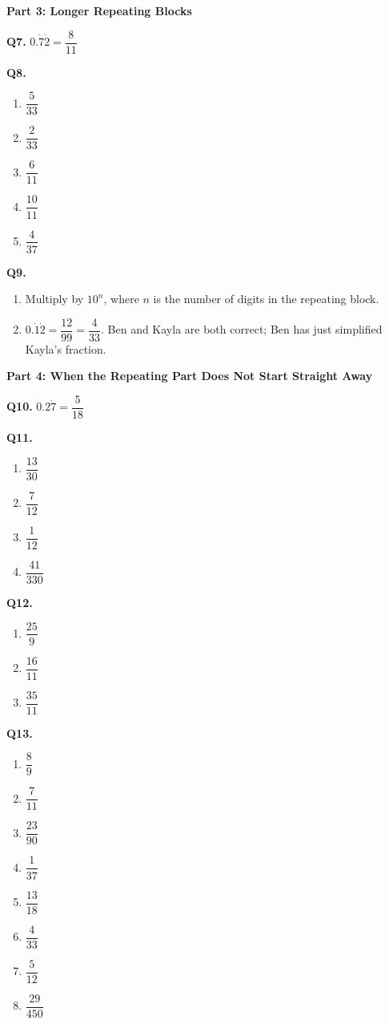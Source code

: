 \documentclass[12pt,a4paper]{article}
\begin{document}
\medskip
\noindent\textbf{\large Part 3: Longer Repeating Blocks}

\medskip
\noindent\textbf{Q7.} $0.\dot{7}\dot{2}=\dfrac{8}{11}$

\medskip
\noindent\textbf{Q8.}
\begin{enumerate}[label=(\alph*),leftmargin=*]
\item $\dfrac{5}{33}$
\item $\dfrac{2}{33}$
\item $\dfrac{6}{11}$
\item $\dfrac{10}{11}$
\item $\dfrac{4}{37}$
\end{enumerate}

\medskip
\noindent\textbf{Q9.}
\begin{enumerate}[label=(\alph*),leftmargin=*]
\item Multiply by $10^n$, where $n$ is the number of digits in the repeating block.
\item $0.\dot{1}\dot{2}=\dfrac{12}{99}=\dfrac{4}{33}$. Ben and Kayla are both correct; Ben has just simplified Kayla’s fraction.
\end{enumerate}

\medskip
\noindent\textbf{\large Part 4: When the Repeating Part Does Not Start Straight Away}

\medskip
\noindent\textbf{Q10.} $0.2\dot{7}=\dfrac{5}{18}$

\medskip
\noindent\textbf{Q11.}
\begin{enumerate}[label=(\alph*),leftmargin=*]
\item $\dfrac{13}{30}$
\item $\dfrac{7}{12}$
\item $\dfrac{1}{12}$
\item $\dfrac{41}{330}$
\end{enumerate}

\medskip
\noindent\textbf{Q12.}
\begin{enumerate}[label=(\alph*),leftmargin=*]
\item $\dfrac{25}{9}$
\item $\dfrac{16}{11}$
\item $\dfrac{35}{11}$
\end{enumerate}

\medskip
\noindent\textbf{Q13.}
\begin{enumerate}[label=(\alph*),leftmargin=*]
\item $\dfrac{8}{9}$
\item $\dfrac{7}{11}$
\item $\dfrac{23}{90}$
\item $\dfrac{1}{37}$
\item $\dfrac{13}{18}$
\item $\dfrac{4}{33}$
\item $\dfrac{5}{12}$
\item $\dfrac{29}{450}$
\end{enumerate}
\end{document}
